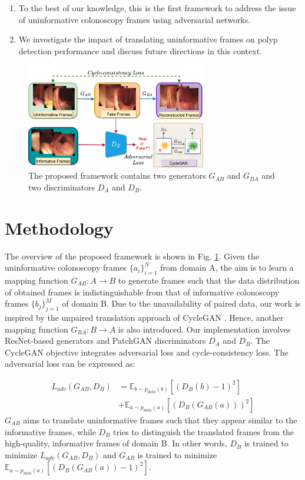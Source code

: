 \documentclass[letterpaper]{article} %
\begin{document}
\begin{enumerate}
    \item To the best of our knowledge, this is the first framework to address the issue of uninformative colonoscopy frames using adversarial networks.
    \item We investigate the impact of translating uninformative frames on polyp detection performance and discuss future directions in this context.
\end{enumerate}

\begin{figure}
    \centering
    \includegraphics[height=130pt, width=\columnwidth]{gan_dia.png}
    \caption{The proposed framework contains two generators $G_{AB}$ and $G_{BA}$ and two discriminators $D_A$ and $D_B$.}
    \label{fig:gan}
\end{figure}




\section{Methodology}
The overview of the proposed framework is shown in Fig. \ref{fig:gan}. Given the uninformative colonoscopy frames $\{a_i\}_{i=1}^N$ from domain A, the aim is to learn a mapping function $G_{AB}: A \rightarrow B$ to generate frames such that the data distribution of obtained frames is indistinguishable from that of informative colonoscopy frames $\{b_j\}_{j=1}^M$ of domain B. Due to the unavailability of paired data, our work is inspired by the unpaired translation approach of CycleGAN \cite{zhu2017unpaired}. Hence, another mapping function $G_{BA}: B \rightarrow A$ is also introduced. Our implementation involves ResNet-based generators and PatchGAN discriminators $D_A$ and $D_B$. The CycleGAN objective integrates adversarial loss and cycle-consistency loss. The adversarial loss can be expressed as:

\begin{equation}
\label{adv}
  \begin{split}
    L_{adv}(G_{AB}, D_B) &= \mathbb{E}_{b\sim p_{data}(b)}[(D_B (b)-1)^2] \\ & + \mathbb{E}_{a\sim p_{data}(a)}[(D_B(G_{AB}(a)))^2]
     \end{split}
\end{equation}
$G_{AB}$ aims to translate uninformative frames such that they appear similar to the informative frames, while $D_B$ tries to distinguish the translated frames from the high-quality, informative frames of domain B. In other words, $D_B$ is trained to minimize $L_{adv}(G_{AB}, D_B)$ and $G_{AB}$ is trained to minimize $\mathbb{E}_{a\sim p_{data}(a)}[(D_B(G_{AB}(a))-1)^2]$.
\end{document}

